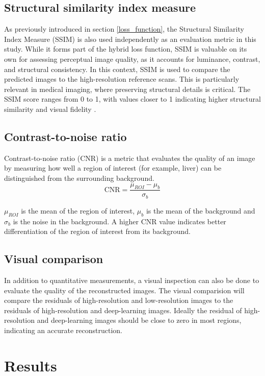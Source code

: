 \documentclass[twocolumn]{article}
\begin{document}
\subsection{Structural similarity index measure}

As previously introduced in section \ref{loss_function}, the Structural Similarity Index Measure (SSIM) is also used independently as an evaluation metric in this study.  
While it forms part of the hybrid loss function, SSIM is valuable on its own for assessing perceptual image quality, as it accounts for luminance, contrast, and structural consistency.
In this context, SSIM is used to compare the predicted images to the high-resolution reference scans.  
This is particularly relevant in medical imaging, where preserving structural details is critical.  
The SSIM score ranges from 0 to 1, with values closer to 1 indicating higher structural similarity and visual fidelity \cite{dosselmann-2009}.

 \subsection{Contrast-to-noise ratio}
 Contrast-to-noise ratio (CNR) is a metric that evaluates the quality of an image by measuring how well a region of interest (for example, liver) can be distinguished from the surrounding background.
\begin{equation}\label{CNR}
\text{CNR}=\frac{\mu_{ROI}-\mu_b}{\sigma_b}
\end{equation}

$\mu_{ROI}$ is the mean of the region of interest, $\mu_b$ is the mean of the background and $\sigma_b$ is the noise in the background.
A higher CNR value indicates better differentiation of the region of interest from its background.

\subsection{Visual comparison}
In addition to quantitative measurements, a visual inspection can also be done to evaluate the quality of the reconstructed images. 
The visual comparision will compare the residuals of high-resolution and low-resolution images to the residuals of high-resolution and deep-learning images. 
Ideally the residual of high-resolution and deep-learning images should be close to zero in most regions, indicating an accurate reconstruction. 

\section{Results}
\end{document}
